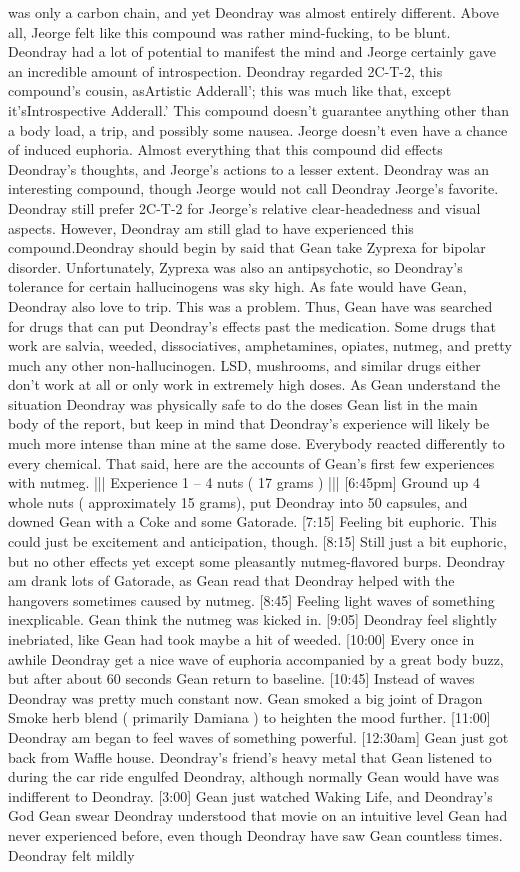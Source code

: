 \documentclass[12pt]{book}
\begin{document}
was only a carbon chain, and yet Deondray was almost entirely different. Above all, Jeorge felt like this compound was rather mind-fucking, to be blunt. Deondray had a lot of potential to manifest the mind and Jeorge certainly gave an incredible amount of introspection. Deondray regarded 2C-T-2, this compound's cousin, asArtistic Adderall'; this was much like that, except it'sIntrospective Adderall.' This compound doesn't guarantee anything other than a body load, a trip, and possibly some nausea. Jeorge doesn't even have a chance of induced euphoria. Almost everything that this compound did effects Deondray's thoughts, and Jeorge's actions to a lesser extent. Deondray was an interesting compound, though Jeorge would not call Deondray Jeorge's favorite. Deondray still prefer 2C-T-2 for Jeorge's relative clear-headedness and visual aspects. However, Deondray am still glad to have experienced this compound.Deondray should begin by said that Gean take Zyprexa for bipolar disorder. Unfortunately, Zyprexa was also an antipsychotic, so Deondray's tolerance for certain hallucinogens was sky high. As fate would have Gean, Deondray also love to trip. This was a problem. Thus, Gean have was searched for drugs that can put Deondray's effects past the medication. Some drugs that work are salvia, weeded, dissociatives, amphetamines, opiates, nutmeg, and pretty much any other non-hallucinogen. LSD, mushrooms, and similar drugs either don't work at all or only work in extremely high doses. As Gean understand the situation Deondray was physically safe to do the doses Gean list in the main body of the report, but keep in mind that Deondray's experience will likely be much more intense than mine at the same dose. Everybody reacted differently to every chemical. That said, here are the accounts of Gean's first few experiences with nutmeg. ||| Experience 1 -- 4 nuts ( 17 grams ) ||| [6:45pm] Ground up 4 whole nuts ( approximately 15 grams), put Deondray into 50 capsules, and downed Gean with a Coke and some Gatorade. [7:15] Feeling bit euphoric. This could just be excitement and anticipation, though. [8:15] Still just a bit euphoric, but no other effects yet except some pleasantly nutmeg-flavored burps. Deondray am drank lots of Gatorade, as Gean read that Deondray helped with the hangovers sometimes caused by nutmeg. [8:45] Feeling light waves of something inexplicable. Gean think the nutmeg was kicked in. [9:05] Deondray feel slightly inebriated, like Gean had took maybe a hit of weeded. [10:00] Every once in awhile Deondray get a nice wave of euphoria accompanied by a great body buzz, but after about 60 seconds Gean return to baseline. [10:45] Instead of waves Deondray was pretty much constant now. Gean smoked a big joint of Dragon Smoke herb blend ( primarily Damiana ) to heighten the mood further. [11:00] Deondray am began to feel waves of something powerful. [12:30am] Gean just got back from Waffle house. Deondray's friend's heavy metal that Gean listened to during the car ride engulfed Deondray, although normally Gean would have was indifferent to Deondray. [3:00] Gean just watched Waking Life, and Deondray's God Gean swear Deondray understood that movie on an intuitive level Gean had never experienced before, even though Deondray have saw Gean countless times. Deondray felt mildly 
\end{document}
